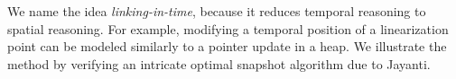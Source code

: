 We name the idea \emph{linking-in-time}, because it reduces temporal
reasoning to spatial reasoning. For example, modifying a temporal position of a
linearization point can be modeled similarly to a pointer update in a heap. 
%
%
%
%
We illustrate the method by verifying an intricate optimal snapshot
algorithm due to Jayanti.


